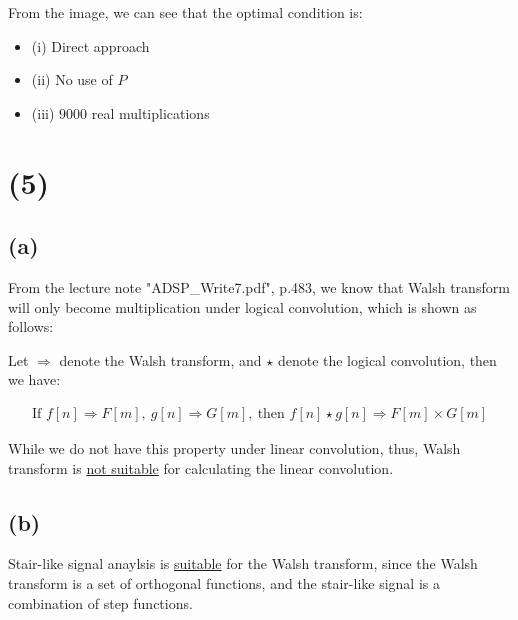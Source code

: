 \documentclass{article}
\begin{document}
From the image, we can see that the optimal condition is: 
\begin{itemize}
    \item (i) Direct approach
    \item (ii) No use of $P$
    \item (iii) $9000$ real multiplications
\end{itemize}

\section*{(5)}

\subsection*{(a)}


From the lecture note "ADSP\_Write7.pdf", p.483, 
we know that Walsh transform will only become multiplication under logical convolution, 
which is shown as follows:
\bigskip
\begin{tcolorbox}[greenbox, title = Walsh transform: Convolution property]
Let $\Rightarrow$ denote the Walsh transform, and $\star$ denote the logical convolution, 
then we have:

\begin{align*}
    \text{If } f[n] \Rightarrow F[m], \ g[n] \Rightarrow G[m], \ \text{then } f[n] \star g[n] \Rightarrow F[m] \times G[m]
\end{align*}

\end{tcolorbox}

While we do not have this property under linear convolution,
thus, Walsh transform is \underline{not suitable} for calculating the linear convolution.

\subsection*{(b)}

Stair-like signal anaylsis is \underline{suitable} for the Walsh transform, 
since the Walsh transform is a set of orthogonal functions, 
and the stair-like signal is a combination of step functions.
\end{document}
